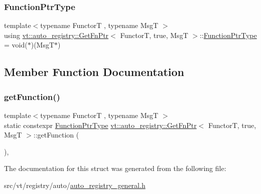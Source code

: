 \subsubsection{\texorpdfstring{Function\+Ptr\+Type}{FunctionPtrType}}
{\footnotesize\ttfamily template$<$typename FunctorT , typename MsgT $>$ \\
using \hyperlink{structvt_1_1auto__registry_1_1_get_fn_ptr}{vt\+::auto\+\_\+registry\+::\+Get\+Fn\+Ptr}$<$ FunctorT, true, MsgT $>$\+::\hyperlink{structvt_1_1auto__registry_1_1_get_fn_ptr_3_01_functor_t_00_01true_00_01_msg_t_01_4_ae65c486f2f9a3ff20b3e79692dc9b1a4}{Function\+Ptr\+Type} =  void($\ast$)(MsgT$\ast$)}



\subsection{Member Function Documentation}
\mbox{\label{structvt_1_1auto__registry_1_1_get_fn_ptr_3_01_functor_t_00_01true_00_01_msg_t_01_4_a54bc99125c7986f3ba1c480414e2b76d}} 
\subsubsection{\texorpdfstring{get\+Function()}{getFunction()}}
{\footnotesize\ttfamily template$<$typename FunctorT , typename MsgT $>$ \\
static constexpr \hyperlink{structvt_1_1auto__registry_1_1_get_fn_ptr_3_01_functor_t_00_01true_00_01_msg_t_01_4_ae65c486f2f9a3ff20b3e79692dc9b1a4}{Function\+Ptr\+Type} \hyperlink{structvt_1_1auto__registry_1_1_get_fn_ptr}{vt\+::auto\+\_\+registry\+::\+Get\+Fn\+Ptr}$<$ FunctorT, true, MsgT $>$\+::get\+Function (\begin{DoxyParamCaption}{ }\end{DoxyParamCaption})\hspace{0.3cm}{\ttfamily [inline]}, {\ttfamily [static]}}



The documentation for this struct was generated from the following file\+:\begin{DoxyCompactItemize}
\item 
src/vt/registry/auto/\hyperlink{auto__registry__general_8h}{auto\+\_\+registry\+\_\+general.\+h}\end{DoxyCompactItemize}

